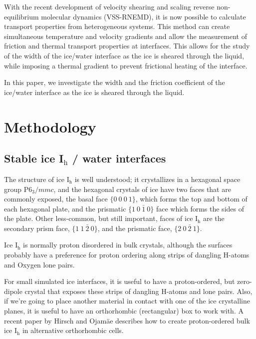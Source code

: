 \documentclass[journal = jpccck, manuscript = article]{achemso}
\begin{document}





With the recent development of velocity shearing and scaling reverse non-equilibrium molecular dynamics (VSS-RNEMD), it is now possible to calculate transport properties from heterogeneous systems.\cite{Kuang12} This method can create simultaneous temperature and velocity gradients and allow the measurement of friction and thermal transport properties at interfaces. This allows for the study of the width of the ice/water interface as the ice is sheared through the liquid, while imposing a thermal gradient to prevent frictional heating of the interface. 

In this paper, we investigate the width and the friction coefficient of the ice/water interface as the ice is sheared through the liquid. 

\section{Methodology}

\subsection{Stable ice I$_\mathrm{h}$ / water interfaces}

The structure of ice I$_\mathrm{h}$ is well understood; it
crystallizes in a hexagonal space group P$6_3/mmc$, and the hexagonal
crystals of ice have two faces that are commonly exposed, the basal
face $\{0~0~0~1\}$, which forms the top and bottom of each hexagonal
plate, and the prismatic $\{1~0~\bar{1}~0\}$ face which forms the
sides of the plate. Other less-common, but still important, faces of
ice I$_\mathrm{h}$ are the secondary prism face, $\{1~1~\bar{2}~0\}$,
and the prismatic face, $\{2~0~\bar{2}~1\}$.

Ice I$_\mathrm{h}$ is normally proton disordered in bulk crystals,
although the surfaces probably have a preference for proton ordering
along strips of dangling H-atoms and Oxygen lone
pairs.\cite{Buch:2008fk}

For small simulated ice interfaces, it is useful to have a
proton-ordered, but zero-dipole crystal that exposes these strips of
dangling H-atoms and lone pairs.  Also, if we're going to place
another material in contact with one of the ice crystalline planes, it
is useful to have an orthorhombic (rectangular) box to work with.  A
recent paper by Hirsch and Ojam\"{a}e describes how to create
proton-ordered bulk ice I$_\mathrm{h}$ in alternative orthorhombic
cells.\cite{Hirsch04}
\end{document}
